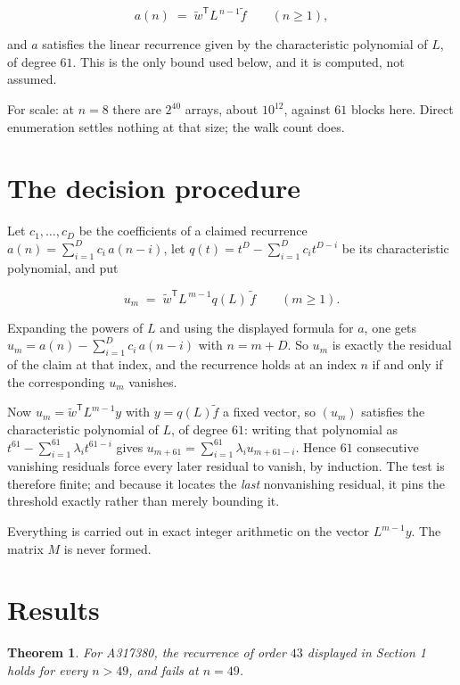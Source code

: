 \documentclass[11pt]{article}
\newtheorem{theorem}{Theorem}
\theoremstyle{definition}
\begin{document}
\[a(n) \;=\; \tilde w^{\mathsf T} L^{\,n-1} \tilde f \qquad (n \ge 1),\]

and $a$ satisfies the linear recurrence given by the characteristic polynomial of $L$, of degree $61$. This is the only bound used below, and it is computed, not assumed.

For scale: at $n = 8$ there are $2^{40}$ arrays, about $10^{12}$, against $61$ blocks here. Direct enumeration settles nothing at that size; the walk count does.

\section{The decision procedure}

Let $c_1,\dots,c_D$ be the coefficients of a claimed recurrence $a(n) = \sum_{i=1}^{D} c_i\,a(n-i)$, let $q(t) = t^{D} - \sum_{i=1}^{D} c_i t^{D-i}$ be its characteristic polynomial, and put

\[u_m \;=\; \tilde w^{\mathsf T} L^{\,m-1} q(L)\,\tilde f \qquad (m \ge 1).\]

Expanding the powers of $L$ and using the displayed formula for $a$, one gets $u_m = a(n) - \sum_{i=1}^{D} c_i\,a(n-i)$ with $n = m + D$. So $u_m$ is exactly the residual of the claim at that index, and the recurrence holds at an index $n$ if and only if the corresponding $u_m$ vanishes.

Now $u_m = \tilde w^{\mathsf T} L^{m-1} y$ with $y = q(L)\tilde f$ a fixed vector, so $(u_m)$ satisfies the characteristic polynomial of $L$, of degree $61$: writing that polynomial as $t^{61} - \sum_{i=1}^{61} \lambda_i t^{61-i}$ gives $u_{m+61} = \sum_{i=1}^{61} \lambda_i u_{m+61-i}$. Hence $61$ consecutive vanishing residuals force every later residual to vanish, by induction. The test is therefore finite; and because it locates the {\itshape last} nonvanishing residual, it pins the threshold exactly rather than merely bounding it.

Everything is carried out in exact integer arithmetic on the vector $L^{m-1}y$. The matrix $M$ is never formed.

\section{Results}

\begin{theorem} For A317380, the recurrence of order $43$ displayed in Section 1 holds for every $n > 49$, and fails at $n = 49$.\end{theorem}
\end{document}
